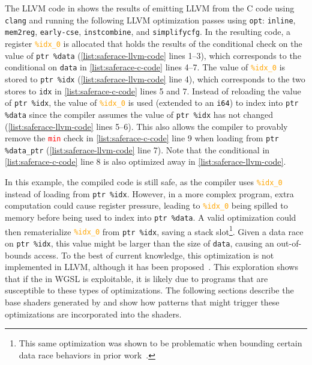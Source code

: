 The LLVM code in \mylisting{\ref{list:saferace-llvm-code}} shows the results of emitting LLVM from the C code using \texttt{clang} and running the following LLVM optimization passes using \texttt{opt}: \texttt{inline}, \texttt{mem2reg}, \texttt{early-cse}, \texttt{instcombine}, and \texttt{simplifycfg}. In the resulting code, a register \textcolor{orange}{\texttt{\%idx\_0}} is allocated that holds the results of the conditional check on the value of \texttt{ptr \%data} (\mylisting\ref{list:saferace-llvm-code} lines 1--3), which corresponds to the conditional on \texttt{data} in \mylisting\ref{list:saferace-c-code} lines 4--7. The value of \textcolor{orange}{\texttt{\%idx\_0}} is stored to \texttt{ptr \%idx} (\mylisting\ref{list:saferace-llvm-code} line 4), which corresponds to the two stores to \texttt{idx} in \mylisting\ref{list:saferace-c-code} lines 5 and 7. Instead of reloading the value of \texttt{ptr \%idx}, the value of \textcolor{orange}{\texttt{\%idx\_0}} is used (extended to an \texttt{i64}) to index into \texttt{ptr \%data} since the compiler assumes the value of \texttt{ptr \%idx} has not changed (\mylisting\ref{list:saferace-llvm-code} lines 5--6). This also allows the compiler to provably remove the \textcolor{red}{\texttt{min}} check in \mylisting\ref{list:saferace-c-code} line 9 when loading from \texttt{ptr \%data\_ptr} (\mylisting\ref{list:saferace-llvm-code} line 7). Note that the conditional in \mylisting\ref{list:saferace-c-code} line 8 is also optimized away in \mylisting\ref{list:saferace-llvm-code}.

In this example, the compiled code is still safe, as the compiler uses \textcolor{orange}{\texttt{\%idx\_0}} instead of loading from \texttt{ptr \%idx}. However, in a more complex program, extra computation could cause register pressure, leading to \textcolor{orange}{\texttt{\%idx\_0}} being spilled to memory before being used to index into \texttt{ptr \%data}. A valid optimization could then rematerialize \textcolor{orange}{\texttt{\%idx\_0}} from \texttt{ptr \%idx}, saving a stack slot\footnote{This same optimization was shown to be problematic when bounding certain data race behaviors in prior work~\cite{dolan2018bounding}.}. Given a data race on \texttt{ptr \%idx}, this value might be larger than the size of \texttt{data}, causing an out-of-bounds access. To the best of current knowledge, this optimization is not implemented in LLVM, although it has been proposed~\cite{llvm_memory_use_markers}. This exploration shows that if the \drsv in WGSL is exploitable, it is likely due to programs that are susceptible to these types of optimizations. The following sections describe the base shaders generated by \wgslmemsmith and show how patterns that might trigger these optimizations are incorporated into the shaders.

